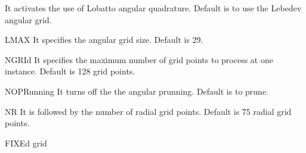 \begin{keywordlist}
It activates the use of Lobatto angular quadrature.
Default is to use the Lebedev angular grid.
\item[LMAX]
It specifies the angular grid size. Default is 29.
\item[NGRId]
It specifies the maximum number of grid points to process at one instance.
Default is 128 grid points.
\item[NOPRunning]
It turns off the the angular prunning. Default is to prune.
\item[NR  ]
It is followed by the number of radial grid points. Default is 75 radial grid points.
\item[FIXEd grid]

\end{keywordlist}

